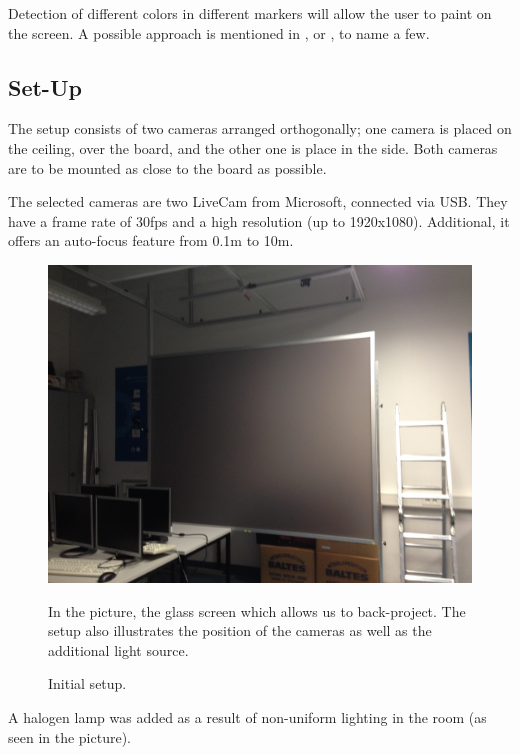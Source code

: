 \documentclass[a4paper,12pt]{article}
\begin{document}
Detection of different colors in different markers will allow the user to paint on the screen. A possible approach is mentioned in \cite{fieguth}, \cite{mason} or \cite{McKenna}, to name a few.

\subsection*{Set-Up}
The setup consists of two cameras arranged orthogonally; one camera is placed on the ceiling, over the board, and the other one is place in the side. Both cameras are to be mounted as close to the board as possible.

The selected cameras are two LiveCam from Microsoft, connected via USB. They have a frame rate of 30fps and a high resolution (up to 1920x1080). Additional, it offers an auto-focus feature from 0.1m to 10m.

\begin{figure}[H]
    \begin{center}
	\includegraphics[width=12cm]{setup}
	\caption{Initial setup.}
    In the picture, the glass screen which allows us to back-project. The setup also illustrates the position of the cameras as well as the additional light source.
	\label{fig:setup}
    \end{center}
\end{figure}

A halogen lamp was added as a result of non-uniform lighting in the room (as seen in the picture).
\end{document}
